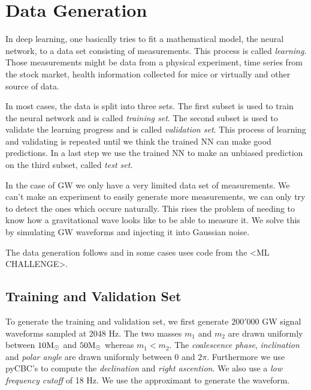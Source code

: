 
\section{Data Generation}
In deep learning, one basically tries to fit a mathematical model, the neural
network, to a data set consisting of measurements. This process is called
\textit{learning}.
Those measurements might be data from a physical experiment, time series from
the stock market, health information collected for mice or virtually and
other source of data.

In most cases, the data is split into three sets. The first subset is used to
train the neural network and is called \textit{training set}. The second subset 
is used to validate the learning progress and is called \textit{validation set}.
This process of learning and validating is repeated until we think the trained
NN can make good predictions. In a last step we use the trained NN to make an
unbiased prediction on the third subset, called \textit{test set}.

In the case of GW we only have a very limited data set of measurements. We can't
make an experiment to easily generate more measurements, we can only try to 
detect the ones which occure naturally. This rises the problem of needing to 
know how a gravitational wave looks like to be able to measure it. We solve this
by simulating GW waveforms and injecting it into Gaussian noise.

The data generation follows and in some cases uses code from the <ML CHALLENGE>.

\subsection{Training and Validation Set}
To generate the training and validation set, we first generate $200'000$ GW signal
waveforms sampled at 2048 Hz. The two masses $m_1$ and $m_2$ are drawn uniformly
between $10 \textup{M}_\odot$
and $50 \textup{M}_\odot$ whereas $m_1 < m_2$. The \textit{coalescence phase},
\textit{inclination} and \textit{polar angle} are drawn uniformly between
$0$ and $2 \pi$. Furthermore we use
pyCBC's  to compute the \textit{declination} and
\textit{right ascention}. We also use a \textit{low frequency cutoff} of 18 Hz.
We use the  approximant to generate the waveform.

